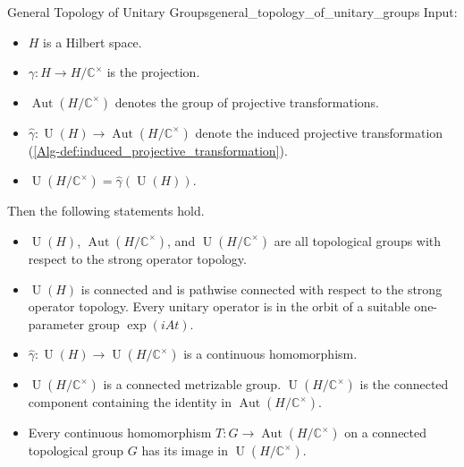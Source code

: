 \documentclass{article}
\begin{document}
\begin{theorem}{General Topology of Unitary Groups}{general_topology_of_unitary_groups}
    Input:
    \begin{itemize}
        \item $H$ is a Hilbert space.
        \item $\gamma: H\rightarrow H/\mathbb{C}^\times$ is the projection.
        \item $\operatorname{Aut}(H/\mathbb{C}^\times)$ denotes the group of projective transformations.
        \item $\hat{\gamma}:\operatorname{U}(H) \rightarrow \operatorname{Aut}(H/\mathbb{C}^\times)$ denote the induced projective transformation (\cref{Alg-def:induced_projective_transformation}).
        \item $\operatorname{U}(H/\mathbb{C}^\times) = \hat{\gamma}(\operatorname{U}(H))$.
    \end{itemize}
    Then the following statements hold.
    \begin{itemize}
        \item $\operatorname{U}(H)$, $\operatorname{Aut}(H/\mathbb{C}^\times)$, and $\operatorname{U}(H/\mathbb{C}^\times)$ are all topological groups with respect to the strong operator topology.
        \item $\operatorname{U}(H)$ is connected and is pathwise connected with respect to the strong operator topology.
        Every unitary operator is in the orbit of a suitable one-parameter group $\exp(iAt)$.
        \item $\hat{\gamma}:\operatorname{U}(H) \rightarrow \operatorname{U}(H/\mathbb{C}^\times)$ is a continuous homomorphism.
        \item $\operatorname{U}(H/\mathbb{C}^\times)$ is a connected metrizable group.
        $\operatorname{U}(H/\mathbb{C}^\times)$ is the connected component containing the identity in $\operatorname{Aut}(H/\mathbb{C}^\times)$.
        \item Every continuous homomorphism $T:G\rightarrow \operatorname{Aut}(H/\mathbb{C}^\times)$ on a connected topological group $G$ has its image in $\operatorname{U}(H/\mathbb{C}^\times)$.
    \end{itemize}
\end{theorem}
\end{document}
